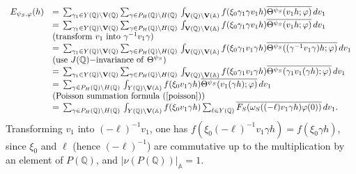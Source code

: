 \documentclass[11pt]{amsart}
\numberwithin{equation}{section}
\theoremstyle{definition}
\begin{document}
$$
\begin{array}{ll}
E_{\psi_S,\varphi}(h)&={\displaystyle}\sum_{\gamma_1\in Y({\mathbb{Q}}){\backslash} \bold V({\mathbb{Q}})}
\sum_{\gamma\in P_H({\mathbb{Q}}){\backslash} H({\mathbb{Q}})}{\displaystyle}\int_{\bold V({\mathbb{Q}})\backslash \bold V({\mathbb{A}})}f(\xi_0\gamma_1 \gamma v_1h)
\overline{\Theta^{\psi_S}(v_1h;\varphi)}\, dv_1 \\
&={\displaystyle}\sum_{\gamma_1\in Y({\mathbb{Q}}){\backslash} \bold V({\mathbb{Q}})}
\sum_{\gamma\in P_H({\mathbb{Q}}){\backslash} H({\mathbb{Q}})}{\displaystyle}\int_{\bold V({\mathbb{Q}})\backslash \bold V({\mathbb{A}})}f(\xi_0\gamma_1 \gamma v_1h)
\overline{\Theta^{\psi_S}(v_1h;\varphi)}\, dv_1 \\
&({\rm transform }\ v_1\ {\rm into}\ \gamma^{-1} v_1 \gamma)\\
&={\displaystyle}\sum_{\gamma_1\in Y({\mathbb{Q}}){\backslash} \bold V({\mathbb{Q}})}
\sum_{\gamma\in P_H({\mathbb{Q}}){\backslash} H({\mathbb{Q}})}{\displaystyle}\int_{\bold V({\mathbb{Q}})\backslash \bold V({\mathbb{A}})}f(\xi_0\gamma_1 v_1\gamma h)
\overline{\Theta^{\psi_S}((\gamma^{-1} v_1 \gamma) h;\varphi)}\, dv_1 \\
& ( {\rm use }\ J({\mathbb{Q}}){\rm -invariance\ of}\  \Theta^{\psi_S})\\
&={\displaystyle}\sum_{\gamma_1\in Y({\mathbb{Q}}){\backslash} \bold V({\mathbb{Q}})}
\sum_{\gamma\in P_H({\mathbb{Q}}){\backslash} H({\mathbb{Q}})}{\displaystyle}\int_{\bold V({\mathbb{Q}})\backslash \bold V({\mathbb{A}})}f(\xi_0\gamma_1 v_1\gamma h)
\overline{\Theta^{\psi_S}(\gamma_1 v_1 (\gamma h);\varphi)}\, dv_1 \\
&={\displaystyle}\sum_{\gamma\in P_H({\mathbb{Q}}){\backslash} H({\mathbb{Q}})}{\displaystyle}\int_{Y({\mathbb{Q}})\backslash \bold V({\mathbb{A}})}f(\xi_0 v_1\gamma h)
\overline{\Theta^{\psi_S}(v_1 (\gamma h);\varphi)}\, dv_1 \\
&({\rm Poisson\ summation\ formula\ (\ref{poisson})}) \\
&={\displaystyle}\sum_{\gamma\in P_H({\mathbb{Q}}){\backslash} H({\mathbb{Q}})}{\displaystyle}\int_{Y({\mathbb{Q}})\backslash \bold V({\mathbb{A}})}f(\xi_0 v_1\gamma h)
\sum_{\ell\in Y({\mathbb{Q}})}\overline{F_S(\omega_S((-\ell)v_1\gamma h)\varphi(0))}\, dv_1. 
\end{array}
$$
Transforming $v_1$ into $(-\ell)^{-1}v_1$, one has $f(\xi_0(-\ell)^{-1}v_1\gamma h)=f(\xi_0\gamma h)$, since 
$\xi_0$ and $\ell$ (hence $(-\ell)^{-1}$) are commutative up to the multiplication by an element of $P({\mathbb{Q}})$, and $|\nu(P({\mathbb{Q}}))|_{\mathbb{A}}=1$.   
\end{document}

